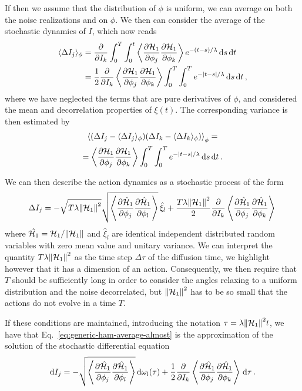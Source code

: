 If then we assume that the distribution of \(\phi\) is uniform, we can average on both the noise realizations and on $\phi$. We then can consider the average of the stochastic dynamics of \(I\), which now reads
\begin{equation}
	\begin{aligned}
		\langle\Delta I_j\rangle_\phi &= \pdv{}{I_k}\int_0^T\int_0^t \left\langle\pdv{\mathcal{H}_1}{\phi_j}\pdv{\mathcal{H}_1}{\phi_k}\right\rangle e^{-(t-s)/\lambda}\,\mathrm{d}s\,\mathrm{d}t\\
		&= \frac{1}{2}\pdv{}{I_k}\left\langle\pdv{\mathcal{H}_1}{\phi_j}\pdv{\mathcal{H}_1}{\phi_k}\right\rangle\int_0^T\int_0^T e^{-\abs{t-s}/\lambda}\,\mathrm{d}s\,\mathrm{d}t\,,
	\end{aligned}
\end{equation}
where we have neglected the terms that are pure derivatives of $\phi$, and considered the mean and decorrelation properties of \(\xi(t)\). The corresponding variance is then estimated by
\begin{multline}
	\left\langle(\Delta I_j - \langle\Delta I_j\rangle_\phi)(\Delta I_k - \langle\Delta I_k\rangle_\phi)\right\rangle_\phi =\\
	= \left\langle\pdv{\mathcal{H}_1}{\phi_j}\pdv{\mathcal{H}_1}{\phi_k}\right\rangle\int_0^T\int_0^T e^{-\abs{t-s}/\lambda}\,\mathrm{d}s\,\mathrm{d}t\,.
\end{multline}

We can then describe the action dynamics as a stochastic process of the form
\begin{equation}
	\Delta I_j = -\sqrt{T\lambda\norm{\mathcal{H}_1}^2}\sqrt{\left\langle\pdv{\hat{\mathcal{H}}_1}{\phi_j}\pdv{\hat{\mathcal{H}}_1}{\phi_l}\right\rangle}\,\hat{\xi}_l + \frac{T\lambda\norm{\mathcal{H}_1}^2}{2}\pdv{}{I_k}\left\langle\pdv{\hat{\mathcal{H}}_1}{\phi_j}\pdv{\hat{\mathcal{H}}_1}{\phi_k}\right\rangle\,
	\label{eq:generic-ham-average-almost}
\end{equation}
where \(\hat{\mathcal{H}_1}=\mathcal{H}_1/\norm{\mathcal{H}_1}\) and \(\hat{\xi}_l\) are identical independent distributed random variables with zero mean value and unitary variance. We can interpret the quantity \(T\lambda\norm{\mathcal{H}_1}^2\) as the time step \(\Delta\tau\) of the diffusion time, we highlight however that it has a dimension of an action. Consequently, we then require that \(T\) should be sufficiently long in order to consider the angles relaxing to a uniform distribution and the noise decorrelated, but \(\norm{\mathcal{H}_1}^2\) has to be so small that the actions do not evolve in a time \(T\). 

If these conditions are maintained, introducing the notation \(\tau = \lambda\norm{\mathcal{H}_1}^2 t\), we have that Eq.~\eqref{eq:generic-ham-average-almost} is the approximation of the solution of the stochastic differential equation
\begin{equation}
	\mathrm{d}I_j = -\sqrt{\left\langle\pdv{\hat{\mathcal{H}}_1}{\phi_j}\pdv{\hat{\mathcal{H}}_1}{\phi_l}\right\rangle}\,\mathrm{d}\omega_l(\tau) + \frac{1}{2}\pdv{}{I_k}\left\langle\pdv{\hat{\mathcal{H}}_1}{\phi_j}\pdv{\hat{\mathcal{H}}_1}{\phi_k}\right\rangle\,\mathrm{d}\tau\,.
	\label{eq:final-ham-approximation}
\end{equation}


